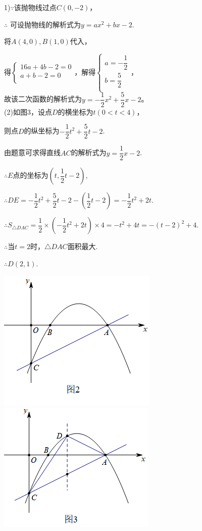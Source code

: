 \documentclass[10pt]{ctexart}
\newcommand{\jd}[1]{\noindent {\kaishu \textbf{解:}#1}}
\begin{document}
\begin{minipage}[t]{0.6\textwidth}
\vspace{-5cm}
\jd (1)$\because$该抛物线过点$C(0,-2)$，

$\therefore$ 可设抛物线的解析式为$y=ax^2+bx-2$.

将$A(4,0),B(1,0)$代入，

得$\begin{cases}
16a+4b-2=0 \\
a+b-2=0 \\
\end{cases}$，解得$\begin{cases}
a=-\dfrac{1}{2}\\
b=\dfrac{5}{2}\\
\end{cases}$，\\[5pt]

故该二次函数的解析式为$y=-\dfrac{1}{2}x^2+\dfrac{5}{2}x-2$。\\[2pt]

(2)如图3，设点$D$的横坐标为$t(0<t<4)$，

则点$D$的纵坐标为$-\dfrac{1}{2}t^2+\dfrac{5}{2}t-2$.

由题意可求得直线$AC$的解析式为$y=\dfrac{1}{2}x-2$.

$\therefore E$点的坐标为$(t,\dfrac{1}{2}t-2)$,

$\therefore DE=-\dfrac{1}{2}t^2+\dfrac{5}{2}t-2-(\dfrac{1}{2}t-2)=-\dfrac{1}{2}t^2+2t$.

$\therefore S_{\triangle DAC}=\dfrac{1}{2}\times (-\dfrac{1}{2}t^2+2t)\times 4=-t^2+4t=-(t-2)^2+4$.

$\therefore$当$t=2$时，$\triangle DAC$面积最大.

$\therefore D(2,1)$.
\end{minipage}
\begin{minipage}[t]{0.4\textwidth}
\includegraphics[scale=0.8]{figure/mj-14.png}
\includegraphics[scale=0.8]{figure/mj-15.png}
\end{minipage}
\end{document}
